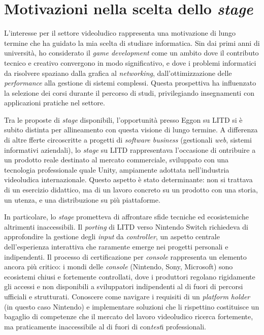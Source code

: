 \section{Motivazioni nella scelta dello \textit{stage}}


L'interesse per il settore videoludico rappresenta una motivazione di lungo termine che ha guidato la mia scelta di studiare informatica. Sin dai primi anni di università, ho considerato il \textit{game development} come un ambito dove il contributo tecnico e creativo convergono in modo significativo, e dove i problemi informatici da risolvere spaziano dalla grafica al \textit{networking}, dall'ottimizzazione delle \textit{performance} alla gestione di sistemi complessi. Questa prospettiva ha influenzato la selezione dei corsi durante il percorso di studi, privilegiando insegnamenti con applicazioni pratiche nel settore.

Tra le proposte di \textit{stage} disponibili, l'opportunità presso Eggon su LITD si è subito distinta per allineamento con questa visione di lungo termine. A differenza di altre fferte circoscritte a progetti di \textit{software business} (gestionali \textit{web}, sistemi informativi aziendali), lo \textit{stage} su LITD rappresentava l'occasione di ontribuire a un prodotto reale destinato al mercato commerciale, sviluppato con una tecnologia professionale quale Unity, ampiamente adottata nell'industria videoludica internazionale. Questo aspetto è stato determinante: non si trattava di un esercizio didattico, ma di un lavoro concreto su un prodotto con una storia, un utenza, e una distribuzione su più piattaforme.

In particolare, lo \textit{stage} prometteva di affrontare sfide tecniche ed ecosistemiche altrimenti inaccessibili. Il \textit{porting} di LITD verso Nintendo Switch richiedeva di approfondire la gestione degli \textit{input} da \textit{controller}, un aspetto centrale dell'esperienza interattiva che raramente emerge nei progetti personali e indipendenti. Il processo di certificazione per \textit{console} rappresenta un elemento ancora più critico: i mondi delle \textit{console} (Nintendo, Sony, Microsoft) sono ecosistemi chiusi e fortemente controllati, dove i produttori regolano rigidamente gli accessi e non disponibili a sviluppatori indipendenti al di fuori di percorsi ufficiali e strutturati. Conoscere come navigare i requisiti di un \textit{platform holder} (in questo caso Nintendo) e implementare soluzioni che li rispettino costituisce un bagaglio di competenze che il mercato del lavoro videoludico ricerca fortemente, ma praticamente inaccessibile al di fuori di con\textit{test}i professionali.

